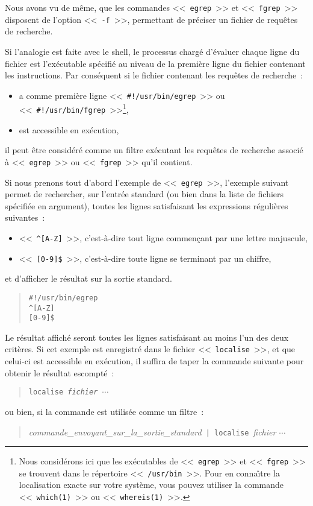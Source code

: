 Nous avons vu de m{\^e}me, que les commandes <<~{\tt egrep}~>> et <<~{\tt fgrep}~>>
disposent de l'option
<<~{\tt -f}~>>, permettant de pr{\'e}ciser un fichier de requ{\^e}tes de recherche.

Si l'analogie est faite avec le shell, le processus charg{\'e} d'{\'e}valuer chaque
ligne du fichier est l'ex{\'e}cutable sp{\'e}cifi{\'e} au niveau de la premi{\`e}re
ligne du fichier contenant les instructions. Par cons{\'e}quent si le fichier
contenant les requ{\^e}tes de recherche~:
\begin{itemize}
	\item	a comme premi{\`e}re ligne <<~\verb=#!/usr/bin/egrep=~>> ou
			<<~\verb=#!/usr/bin/fgrep=~>>\footnote{Nous
			consid{\'e}rons ici que les ex{\'e}cutables de <<~{\tt egrep}~>> et
			<<~{\tt fgrep}~>> se trouvent dans
			le r{\'e}pertoire <<~{\tt /usr/bin}~>>. Pour en conna{\^\i}tre la
			localisation exacte sur votre syst{\`e}me, vous pouvez utiliser
			la commande <<~{\tt which(1)}~>> ou <<~{\tt whereis(1)}~>>.},
	\item	est accessible en ex{\'e}cution,
\end{itemize}
il peut {\^e}tre consid{\'e}r{\'e} comme un filtre ex{\'e}cutant les requ{\^e}tes de
recherche associ{\'e} {\`a} <<~{\tt egrep}~>> ou <<~{\tt fgrep}~>> qu'il contient.

Si nous prenons tout d'abord l'exemple de <<~{\tt egrep}~>>, l'exemple suivant
permet de rechercher, sur l'entr{\'e}e standard (ou bien dans la liste de fichiers
sp{\'e}cifi{\'e}e en argument), toutes les lignes satisfaisant les expressions r{\'e}guli{\`e}res
suivantes~:
\begin{itemize}
	\item	<<~\verb=^[A-Z]=~>>, c'est-{\`a}-dire tout ligne commen\c{c}ant par une lettre
			majuscule,
	\item	<<~\verb=[0-9]$=~>>, c'est-{\`a}-dire toute ligne se terminant par un
			chiffre,
\end{itemize}
et d'afficher le r{\'e}sultat sur la sortie standard.
\begin{quote}
\begin{verbatim}
#!/usr/bin/egrep
^[A-Z]
[0-9]$
\end{verbatim}
\end{quote}

Le r{\'e}sultat affich{\'e} seront toutes les lignes satisfaisant au moins l'un des
deux crit{\`e}res. Si cet exemple est enregistr{\'e} dans le fichier <<~{\tt localise}~>>,
et que celui-ci est accessible en ex{\'e}cution, il suffira de taper la commande
suivante pour obtenir le r{\'e}sultat escompt{\'e}~:
\begin{quote}
{\tt localise~{\sl fichier $\cdots$}}
\end{quote}
ou bien, si la commande est utilis{\'e}e comme un filtre~:
\begin{quote}
{\sl commande\_envoyant\_sur\_la\_sortie\_standard}~\verb=| localise=~{\sl fichier $\cdots$}
\end{quote}

